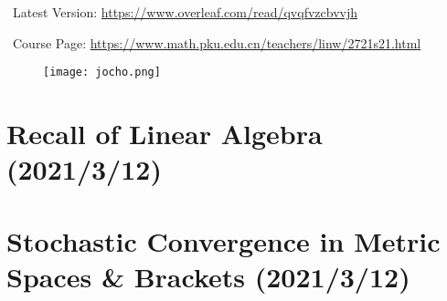 \documentclass[11pt, a3paper, openany]{article}
\theoremstyle{remark}
\theoremstyle{remark}
\theoremstyle{remark}
\newenvironment{Proof of claim}
  {\begin{proof}[\normalfont \textbf{Proof of claim}]}
  {\end{proof}}
\begin{document}
\Pickup\ Latest Version: \url{https://www.overleaf.com/read/qvqfvzcbvvjh}

\Pickup\ Course Page: \url{https://www.math.pku.edu.cn/teachers/linw/2721s21.html}

\begin{figure}[!b]
	\centering
	\texttt{[image: jocho.png]}
	\vspace{11ex}
\end{figure}

\clearpage
{}
\setcounter{page}{1}

\section{Recall of Linear Algebra \sf\scriptsize (2021/3/12)}
\section{Stochastic Convergence in Metric Spaces \& Brackets \sf\scriptsize (2021/3/12)}
\end{document}
